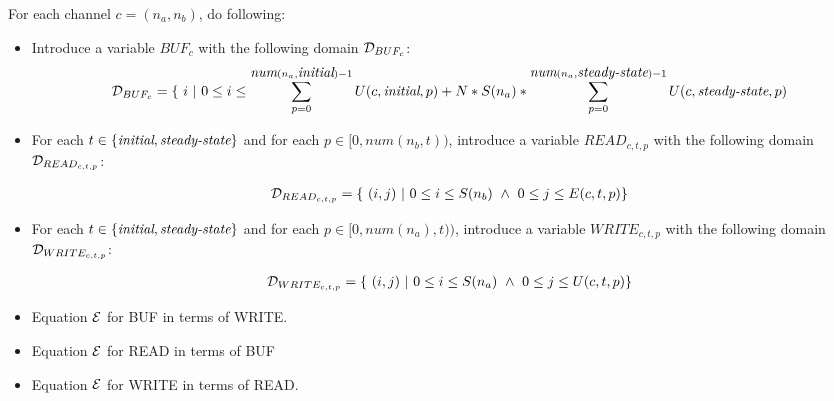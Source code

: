For each channel $c = (n_a, n_b)$, do following:
\begin{itemize}

\item Introduce a variable $BUF_c$ with the following domain ${\cal
D}_{BUF_c}$:
\begin{align*}
{\cal D}_{BUF_c} = \{~i~|~0 \le i \le \sum_{p=0}^{\mbox{\it num}(n_a,
\mbox{\it initial})-1} U(c, \mbox{\it initial}, p) + N * S(n_a) *
\sum_{p=0}^{\mbox{\it num}(n_a, \mbox{\it steady-state})-1} U(c,
\mbox{\it steady-state}, p)
\end{align*}

\item For each $t \in \{\mbox{\it initial}, \mbox{\it steady-state}\}$ and
for each $p \in [0, num(n_b, t))$, introduce a variable $READ_{c, t,
p}$ with the following domain ${\cal D}_{READ_{c, t, p}}$:

\begin{align*}
{\cal D}_{READ_{c, t, p}} = \{~(i,j)~|~0 \le i \le S(n_b) ~\wedge~ 0 \le j \le E(c, t, p)\}
\end{align*}

\item For each $t \in \{\mbox{\it initial}, \mbox{\it steady-state}\}$ and
for each $p \in [0, num(n_a), t))$, introduce a variable $WRITE_{c, t,
p}$ with the following domain ${\cal D}_{WRITE_{c, t, p}}$:

\begin{align*}
{\cal D}_{WRITE_{c, t, p}} = \{~(i,j)~|~0 \le i \le S(n_a) ~\wedge~ 0 \le j \le U(c, t, p)\}
\end{align*}

\item Equation ${\cal E}$ for BUF in terms of WRITE.

\item Equation ${\cal E}$ for READ in terms of BUF

\item Equation ${\cal E}$ for WRITE in terms of READ.

\end{itemize}






